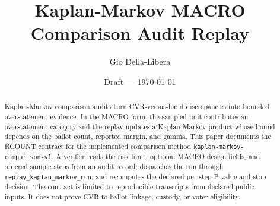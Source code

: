 \documentclass[12pt]{article}
\title{Kaplan-Markov MACRO Comparison Audit Replay}
\author{Gio Della-Libera}
\date{Draft --- \today}
\begin{document}
\maketitle

\begin{abstract}
Kaplan-Markov comparison audits turn CVR-versus-hand discrepancies into
bounded overstatement evidence. In the MACRO form, the sampled unit contributes
an overstatement category and the replay updates a Kaplan-Markov product whose
bound depends on the ballot count, reported margin, and gamma. This paper
documents the RCOUNT contract for the implemented comparison method
\texttt{kaplan-markov-comparison-v1}. A verifier reads the risk limit, optional
MACRO design fields, and ordered sample steps from an audit record; dispatches
the run through \texttt{replay\_kaplan\_markov\_run}; and recomputes the declared
per-step P-value and stop decision. The contract is limited to reproducible
transcripts from declared public inputs. It does not prove CVR-to-ballot
linkage, custody, or voter eligibility.
\end{abstract}








\nocite{rcount-overview-2026,rcount-v12-2026}


\end{document}
